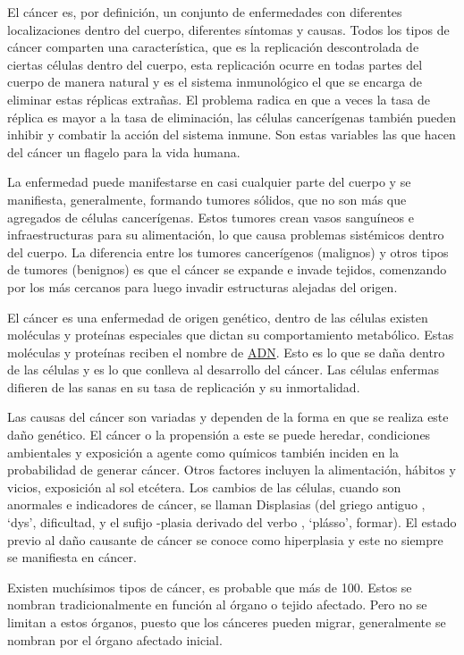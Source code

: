 
El cáncer es, por definición, un conjunto de enfermedades con diferentes
localizaciones dentro del cuerpo, diferentes síntomas y causas. Todos los tipos
de cáncer comparten una característica, que es la replicación descontrolada de
ciertas células dentro del cuerpo, esta replicación ocurre en todas partes del
cuerpo de manera natural y es el sistema inmunológico el que se encarga de
eliminar estas réplicas extrañas. El problema radica en que a veces la tasa de
réplica es mayor a la tasa de eliminación, las células cancerígenas también
pueden inhibir y combatir la acción del sistema inmune. Son estas variables las
que hacen del cáncer un flagelo para la vida humana.

La enfermedad puede manifestarse en casi cualquier parte del cuerpo y se
manifiesta, generalmente, formando tumores sólidos, que no son
más que agregados de células cancerígenas. Estos tumores crean vasos sanguíneos
e infraestructuras para su alimentación, lo que causa problemas sistémicos
dentro del cuerpo. La diferencia entre los tumores cancerígenos (malignos) y
otros tipos de tumores (benignos) es que el cáncer se expande e invade tejidos,
comenzando por los más cercanos para luego invadir estructuras alejadas del
origen.

El cáncer es una enfermedad de origen genético, dentro de las células existen
moléculas y proteínas especiales que dictan su comportamiento metabólico. Estas
moléculas y proteínas reciben el nombre de \hyperlink{abbr}{ADN}. Esto es lo que
se daña dentro de las células y es lo que conlleva al desarrollo del cáncer. Las
células enfermas difieren de las sanas en su tasa de replicación y su
inmortalidad.

Las causas del cáncer son variadas y dependen de la forma en que se realiza este
daño genético. El cáncer o la propensión a este se puede heredar, condiciones
ambientales y exposición a agente como químicos también inciden en la
probabilidad de generar cáncer. Otros factores incluyen la alimentación, hábitos
y vicios, exposición al sol etcétera. Los cambios de las células, cuando son
anormales e indicadores de cáncer, se llaman Displasias (del
griego antiguo \textdelta\textupsilon\textvarsigma, `dys', dificultad, y el
sufijo -plasia derivado del verbo
\textpi\textlambda\textalpha\textsigma\textsigma\textomega, `plásso', formar).
El estado previo al daño causante de cáncer se conoce como hiperplasia y este no
siempre se manifiesta en cáncer.

Existen muchísimos tipos de cáncer, es probable que más de 100. Estos se nombran
tradicionalmente en función al órgano o tejido afectado. Pero no se limitan a
estos órganos, puesto que los cánceres pueden migrar, generalmente se nombran
por el órgano afectado inicial.

